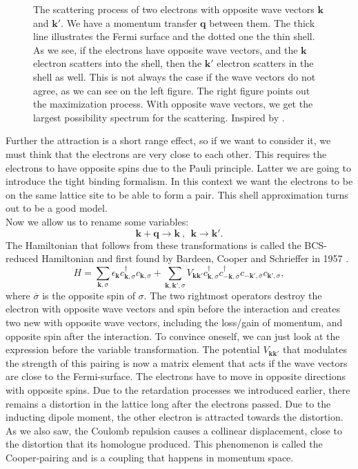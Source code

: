\documentclass[../main.tex]{subfile}
\begin{document}
\begin{figure}[H]
    \caption{The scattering process of two electrons with opposite wave vectors $\bm{k}$ and $\bm{k}'$. We have a momentum transfer $\bm{q}$ between them. 
    The thick line illustrates the Fermi surface and the dotted one the thin shell. As we see, if the electrons have opposite wave vectors, and the $\bm{k}$ electron
    scatters into the shell, then the $\bm{k}'$ electron scatters in the shell as well. This is not always the case if the wave vectors do not agree, as we can see on the left figure.
    The right figure points out the maximization process. With opposite wave vectors,
    we get the largest possibility spectrum for the scattering. Inspired by \cite{FossheimSudbo2004}.}
\end{figure}
Further the attraction is a short range effect, so if we want to consider it, we must think that the electrons are very close to each other.
This requires the electrons to have opposite spins due to the Pauli principle. Latter we are going to introduce the tight binding formalism. In this context we want
the electrons to be on the same lattice site to be able to form a pair. This shell approximation turns out to be a good model.\\

Now we allow us to rename some variables:
\[
    \bm{k} + \bm{q} \longrightarrow \bm{k} ~,~~ \bm{k} \longrightarrow \bm{k}'.
\]
The Hamiltonian that follows from these transformations is called the BCS-reduced Hamiltonian and first found by Bardeen, Cooper and Schrieffer in 1957 \cite{BCS1957}.
\begin{equation} \label{eq:BCS_ReducedHamiltonian}
    H = \sum_{\bm{k},\sigma} \epsilon_{\bm{k}} c_{\bm{k},\sigma}^{\dagger}c_{\bm{k},\sigma} +
     \sum_{\bm{k},\bm{k}',\sigma} V_{\bm{k}\bm{k}'} c_{\bm{k},\sigma}^{\dagger}c_{-\bm{k},\overline{\sigma}}^{\dagger}c_{-\bm{k}',\overline{\sigma}}c_{\bm{k}',\sigma},
\end{equation}
where $\overline{\sigma}$ is the opposite spin of $\sigma$. 
The two rightmost operators destroy the electron with opposite wave vectors and spin before the interaction and creates two new with opposite wave vectors, including the
 loss/gain of momentum, and opposite spin after the interaction. To convince oneself, we can just look at the expression before the variable transformation. The potential $V_{\bm{k}\bm{k}'}$ 
 that modulates the strength of this pairing is now a matrix element that acts if the wave vectors are close to the Fermi-surface. The electrons have to move in opposite directions with opposite spins.
Due to the retardation processes we introduced earlier, there remains a distortion in the lattice long after the electrons passed. Due to the inducting dipole moment,
the other electron is attracted towards the distortion. As we also saw, the Coulomb repulsion causes a collinear displacement, close to the distortion
that its homologue produced. This phenomenon is called the Cooper-pairing and is a coupling that happens in momentum space.\\
\end{document}

